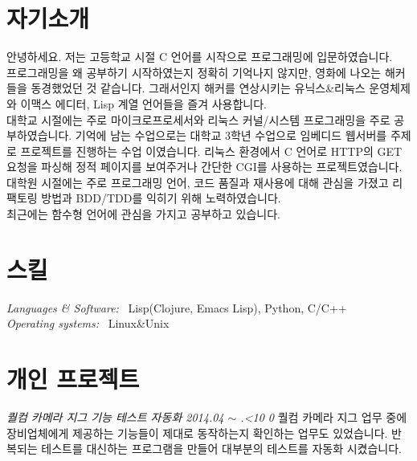 \documentclass[line,margin]{res}
\renewcommand{\today}{\number\year.\ifnum\number\month<10 0\fi \number\month}
\begin{document}
\address{E-mail: vmfhrmfoaj@yahoo.com}


\begin{resume}

  \section{자기소개}

  안녕하세요.
  저는 고등학교 시절 C 언어를 시작으로 프로그래밍에 입문하였습니다. \\
  프로그래밍을 왜 공부하기 시작하였는지 정확히 기억나지 않지만, 영화에 나오는 해커들을 동경했었던 것 같습니다.
  그래서인지 해커를 연상시키는 유닉스\&리눅스 운영체제와 이맥스 에디터, Lisp 계열 언어들을 즐겨 사용합니다. \\
  대학교 시절에는 주로 마이크로프로세서와 리눅스 커널/시스템 프로그래밍을 주로 공부하였습니다.
  기억에 남는 수업으로는 대학교 3학년 수업으로 임베디드 웹서버를 주제로 프로젝트를 진행하는 수업 이였습니다.
  리눅스 환경에서 C 언어로 HTTP의 GET 요청을 파싱해 정적 페이지를 보여주거나 간단한 CGI를 사용하는 프로젝트였습니다. \\
  대학원 시절에는 주로 프로그래밍 언어, 코드 품질과 재사용에 대해 관심을 가졌고
  리팩토링 방법과 BDD/TDD를 익히기 위해 노력하였습니다. \\
  최근에는 함수형 언어에 관심을 가지고 공부하고 있습니다.



  \section{스킬}

  {\sl Languages \& Software:} ~Lisp({\small Clojure, Emacs Lisp}), Python, C/C++ \\
  {\sl Operating systems:} ~Linux\&Unix


  \section{개인 프로젝트}

  {\sl 퀄컴 카메라 지그 기능 테스트 자동화 \hfill 2014.04 $\sim$ \today}
  \vspace{1mm}
  \newline
  {
    \small
    퀄컴 카메라 지그 업무 중에 장비업체에게 제공하는 기능들이 제대로 동작하는지 확인하는 업무도 있었습니다.
    반복되는 테스트를 대신하는 프로그램을 만들어 대부분의 테스트를 자동화 시켰습니다.
  }



\end{resume}
\end{document}
